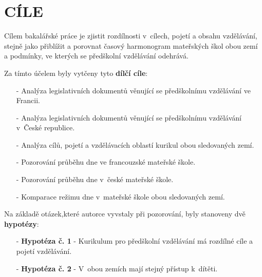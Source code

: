\chapter{CÍLE}
\label{cile}
Cílem bakalářské práce je zjistit rozdílnosti v~cílech, pojetí a obsahu vzdělávání, stejně jako přiblížit a porovnat časový harmonogram mateřských škol obou zemí a podmínky, ve kterých se předškolní vzdělávání odehrává. 

Za tímto účelem byly vytčeny tyto \textbf{dílčí cíle}:

\begin{itemize}
	\setlength\itemsep{-2mm}
	\item [-] Analýza legislativních dokumentů věnující se předškolnímu vzdělávání ve Francii.
	\item [-] Analýza legislativních dokumentů věnující se předškolnímu vzdělávání v~České republice.
	\item [-] Analýza cílů, pojetí a vzdělávacích oblastí kurikul obou sledovaných zemí.
	\item [-] Pozorování průběhu dne ve francouzské mateřské škole.
	\item [-] Pozorování průběhu dne v~české mateřské škole. 
	\item [-] Komparace režimu dne v~mateřské škole obou sledovaných zemí.
\end{itemize}


Na základě otázek,které autorce vyvstaly při pozorování, byly stanoveny dvě \textbf{hypotézy}:

\begin{itemize}
\item[-] \textbf{Hypotéza č. 1} - Kurikulum pro předškolní vzdělávání má rozdílné cíle a pojetí vzdělávání.
\item[-] \textbf{Hypotéza č. 2} - V~obou zemích mají stejný přístup k~dítěti. 
\end{itemize}
